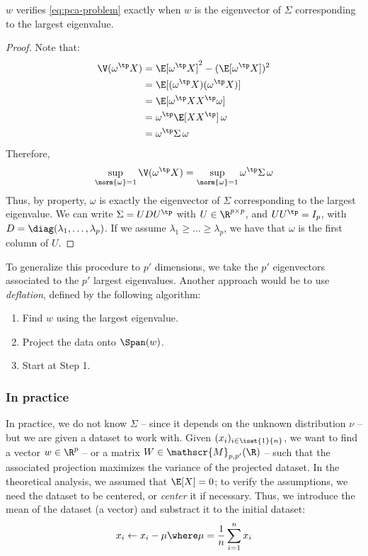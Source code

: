 \documentclass[toc, titlepaged]{../cs-classes/cs-classes}
\begin{document}
\begin{theorem}
    $w$ verifies \eqref{eq:pca-problem} exactly when $w$ is the eigenvector of $\Sigma$ corresponding to the largest eigenvalue.
\end{theorem}
\begin{proof}
    Note that:
    \begin{equation*}
        \begin{aligned}
            \V(\omega^\tp X)&=\E[\omega^\tp X]^2-(\E[\omega^\tp X])^2\\
            &= \E[(\omega^\tp X)(\omega^\tp X)] \\
            &= \E[\omega^\tp XX^\tp\omega]\\
            &=\omega^\tp\E[XX^\tp]\,\omega \\
            &= \omega^\tp\Sigma\,\omega
        \end{aligned}
    \end{equation*}
    Therefore,
    \begin{equation*}
        \sup_{\norm{\omega}=1}\V(\omega^\tp X) = \sup_{\norm{\omega}=1}\omega^\tp\Sigma\,\omega
    \end{equation*}
    Thus, by property, $\omega$ is exactly the eigenvector of $\Sigma$ corresponding to the largest eigenvalue. We can write $\Sigma=UDU^\tp$ with $U\in\R^{p\times p}$, and $UU^\tp=I_p$, with $D=\diag(\lambda_1, \dots, \lambda_p)$. If we assume $\lambda_1\geq\dots\geq\lambda_p$, we have that $\omega$ is the first column of $U$. %
\end{proof}

\begin{remark}
    To generalize this procedure to $p'$ dimensions, we take the $p'$ eigenvectors associated to the $p'$ largest eigenvalues. Another approach would be to use \emph{deflation}, defined by the following algorithm:
    \begin{enumerate}
        \item Find $w$ using the largest eigenvalue.
        \item Project the data onto $\Span(w)$.
        \item Start at Step 1.
    \end{enumerate}
\end{remark}

\subsubsection{In practice}
In practice, we do not know $\Sigma$ -- since it depends on the unknown distribution $\nu$ -- but we are given a dataset to work with. Given $(x_i)_{i\in\iset{1}{n}}$, we want to find a vector $w\in\R^p$ -- or a matrix $W\in\mathscr{M}_{p, p'}(\R)$ -- such that the associated projection maximizes the variance of the projected dataset. In the theoretical analysis, we assumed that $\E[X]=0$; to verify the assumptions, we need the dataset to be centered, or \emph{center} it if necessary. Thus, we introduce the mean of the dataset (a vector) and substract it to the initial dataset:
\begin{equation*}
    x_i\leftarrow x_i-\mu \where \mu=\frac{1}{n}\sum_{i=1}^n x_i
\end{equation*}
\end{document}
